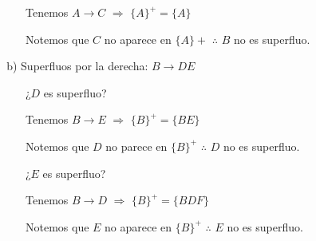 \documentclass[12pt, letterpaper]{article}
\begin{document}
\begin{itemize}
\begin{itemize}
\begin{itemize}
\begin{itemize}
\begin{enumerate}
                                                                  Tenemos $A \rightarrow C$ $\Rightarrow$ $\{A\}^+=\{A\}$ \vspace{.1cm}

                                                                  Notemos que $C$ no aparece en $\{A\}+$ $\therefore$ $B$ no es superfluo.\vspace{.3cm}

                                                      \end{enumerate} 

                                            \item[b)] Superfluos por la derecha: $B \rightarrow DE$
                                            
                                                      \begin{enumerate}
                                                          \item[] ¿$D$ es superfluo? \vspace{.1cm}
                                                           
                                                                  Tenemos $B \rightarrow E$ $\Rightarrow$ $\{B\}^+=\{BE\}$ \vspace{.1cm}

                                                                  Notemos que $D$ no parece en $\{B\}^+$ $\therefore$ $D$ no es superfluo. \vspace{.2cm}

                                                          \item[] ¿$E$ es superfluo? \vspace{.1cm}
                                                          
                                                                  Tenemos $B \rightarrow D$ $\Rightarrow$ $\{B\}^+=\{BDF\}$ \vspace{.1cm}

                                                                  Notemos que $E$ no aparece en $\{B\}^+$ $\therefore$ $E$ no es superfluo.\vspace{.3cm}

                                                      \end{enumerate}
                                             
                                        \end{itemize}
                         

\end{itemize}
\end{itemize}
\end{itemize}
\end{document}
